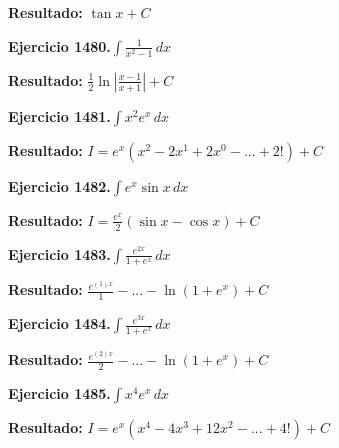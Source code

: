 \documentclass[10pt,a4paper]{article}
\begin{document}
\begin{solbox}
\textbf{Resultado:} \(\displaystyle \tan x + C\)
\end{solbox}

\newpage
\begin{ejbox}
\textbf{Ejercicio 1480.}\quad $\int \frac{1}{x^2-1}\,dx$
\end{ejbox}

\begin{solbox}
\textbf{Resultado:} \(\displaystyle \frac{1}{2}\ln\left|\frac{x-1}{x+1}\right| + C\)
\end{solbox}

\begin{ejbox}
\textbf{Ejercicio 1481.}\quad $\int x^{2} e^x\,dx$
\end{ejbox}

\begin{solbox}
\textbf{Resultado:} \(\displaystyle I = e^x(x^{2} - 2x^{1} + 2x^{0} - ... + 2!) + C\)
\end{solbox}

\begin{ejbox}
\textbf{Ejercicio 1482.}\quad $\int e^x\sin x\,dx$
\end{ejbox}

\begin{solbox}
\textbf{Resultado:} \(\displaystyle I = \frac{e^x}{2}(\sin x - \cos x) + C\)
\end{solbox}

\newpage
\begin{ejbox}
\textbf{Ejercicio 1483.}\quad $\int \frac{e^{2x}}{1+e^{x}}\,dx$
\end{ejbox}

\begin{solbox}
\textbf{Resultado:} \(\displaystyle \frac{e^{(1)x}}{1} - ... - \ln(1+e^x) + C\)
\end{solbox}

\begin{ejbox}
\textbf{Ejercicio 1484.}\quad $\int \frac{e^{3x}}{1+e^{x}}\,dx$
\end{ejbox}

\begin{solbox}
\textbf{Resultado:} \(\displaystyle \frac{e^{(2)x}}{2} - ... - \ln(1+e^x) + C\)
\end{solbox}

\begin{ejbox}
\textbf{Ejercicio 1485.}\quad $\int x^{4} e^x\,dx$
\end{ejbox}

\begin{solbox}
\textbf{Resultado:} \(\displaystyle I = e^x(x^{4} - 4x^{3} + 12x^{2} - ... + 4!) + C\)
\end{solbox}
\end{document}
